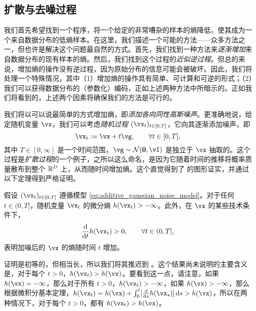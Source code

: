 \documentclass[../../book-main.tex]{subfiles}
\begin{document}
\subsection{扩散与去噪过程} \label{sub:intro_diffusion_denoising}

我们首先希望找到一个程序，将一个给定的非常嘈杂的样本的熵降低，使其成为一个来自数据分布的低熵样本。在这里，我们描述一个可能的方法——众多方法之一，但也许是解决这个问题最自然的方式。首先，我们找到一种方法来\textit{逐渐增加}来自数据分布的现有样本的熵。然后，我们找到这个过程的\textit{近似逆过程}。但总的来说，增加熵的操作没有逆过程，因为原始分布的信息可能会被破坏。因此，我们将处理一个特殊情况，其中（1）增加熵的操作具有简单、可计算和可逆的形式；（2）我们可以获得数据分布的（参数化）编码，正如上述两种方法中所暗示的。正如我们将看到的，上述两个因素将确保我们的方法是可行的。

我们将以可以说最简单的方式增加熵，即\textit{添加各向同性高斯噪声}。更准确地说，给定随机变量 \(\vx\)，我们可以考虑\textit{随机过程} \((\vx_{t})_{t \in [0, T]}\)，它向其逐渐添加噪声，即
\begin{equation}\label{eq:additive_gaussian_noise_model}
	\vx_{t} := \vx + t\vg, \qquad \forall t \in [0, T],
\end{equation}
其中 \(T \in [0, \infty]\) 是一个时间范围，\(\vg \sim \dNorm(\vzero, \vI)\) 是独立于 \(\vx\) 抽取的。这个过程是\textit{扩散过程}的一个例子，之所以这么命名，是因为它随着时间的推移将概率质量散布到整个 \(\mathbb{R}^{D}\) 上，从而随时间增加熵。这个直觉得到了  的图形证实，并通过以下定理得到严格证明。
\begin{theorem}
	假设 \((\vx_{t})_{t \in [0, T]}\) 遵循模型 \eqref{eq:additive_gaussian_noise_model}。对于任何 \(t \in (0, T]\)，随机变量 \(\vx_{t}\) 的微分熵 \(h(\vx_{t}) > -\infty\)。此外，在 \(\vx\) 的某些技术条件下，
	\begin{equation}
		\odv*{h(\vx_{t})}{t} > 0, \qquad \forall t \in (0, T],
	\end{equation}
	表明加噪后的 \(\vx\) 的熵随时间 \(t\) 增加。
\end{theorem}
证明是初等的，但相当长，所以我们将其推迟到 。这个结果尚未说明的主要含义是，对于每个 \(t > 0\)，\(h(\vx_{t}) > h(\vx)\)。要看到这一点，请注意，如果 \(h(\vx) = -\infty\)，那么对于所有 \(t > 0\)，\(h(\vx_{t}) > -\infty\)，如果 \(h(\vx) > -\infty\)，那么根据微积分基本定理，\(h(\vx_{t}) = h(\vx) + \int_{0}^{t}[\odv*{h(\vx_{s})}{s}]\odif{s} > h(\vx)\)，所以在两种情况下，对于每个 \(t > 0\)，都有 \(h(\vx_{t}) > h(\vx)\)。
\end{document}
